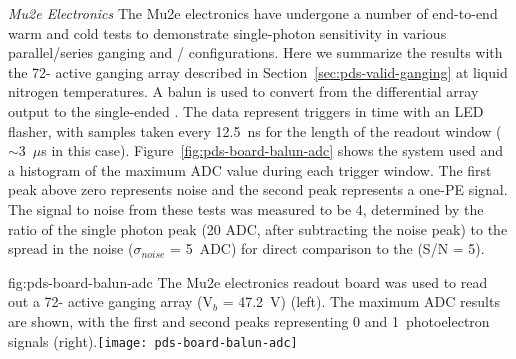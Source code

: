\textit{Mu2e Electronics}
The Mu2e electronics have undergone a number of end-to-end warm and cold tests to demonstrate single-photon sensitivity in various parallel/series ganging and / configurations. Here we summarize the results with the 72- active ganging array described in Section~\ref{sec:pds-valid-ganging}
at liquid nitrogen temperatures. 
A balun is used to convert from the differential  array output to the single-ended . The data represent triggers in time with an LED flasher, with samples taken every 12.5~ns for the length of the readout window ($\sim$3~$\mu$s in this case). Figure~\ref{fig:pds-board-balun-adc} shows the system used and a histogram of the maximum ADC value during each trigger window. The first peak above zero represents noise and the second peak represents a one-PE signal. The signal to noise from these tests was measured to be 4, determined by the ratio of the single photon peak (20 ADC, after subtracting the noise peak) to the spread in the noise ($\sigma_{noise}$ = 5~ADC) for direct comparison to the  (S/N = 5).

\begin{dunefigure}
{fig:pds-board-balun-adc}
{The Mu2e electronics readout board was used to read out a 72- active ganging array (V$_b$ = \SI{47.2}{V}) (left). The maximum ADC results are shown, with the first and second peaks representing 0 and 1~photoelectron signals (right).}\texttt{[image: pds-board-balun-adc]} 
\vspace{-7.0cm}
\end{dunefigure}


